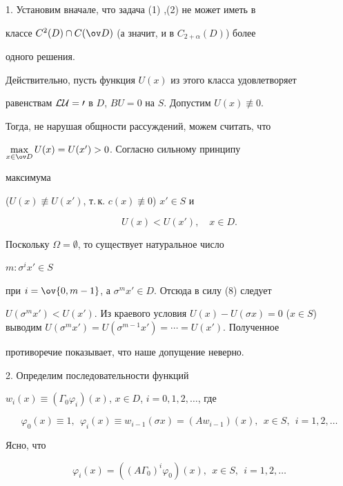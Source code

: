 1. Установим вначале, что задача (1) ,(2) не может иметь в 


классе $C^2(D)\cap C(\ov D)$ (а значит, и в $C_{2+\alpha}(D)$) более 


одного решения. 


Действительно, пусть функция $U(x)$ из этого класса удовлетворяет 


равенствам $\cal L\cal U=0$ в $D$, $B U=0$ на $S$. Допустим $U(x)\not\equiv0$. 


Тогда, не нарушая общности рассуждений, можем считать, что 


$\max\limits_{x\in\ov D}U(x)=U(x')>0$. Согласно сильному принципу 


максимума 


($U(x)\not\equiv U(x')$, т.\,к. $c(x)\not\equiv0$) $x'\in S$ и 


\begin{equation} 


U(x)<U(x'),\quad x\in D. 


\end{equation} 


Поскольку $\Omega=\emptyset$, то существует натуральное число 


$m:\sigma^i x'\in S$ 


при $i=\ov{0,m-1}$, а $\sigma^m x'\in D$. Отсюда в силу (8) следует 


$U(\sigma^m x')<U(x')$. Из краевого условия $U(x)-U(\sigma x)=0$ ($x\in 


S$) выводим $U(\sigma^m x')=U(\sigma^{m-1}x')=\dotsb=U(x')$. Полученное 


противоречие показывает, что наше допущение неверно. 


\medskip 


 


2. Определим последовательности функций 


$w_i(x)\equiv(\Gamma_0\varphi_i)(x)$, $x\in D$, $i=0,1,2,\dotsc$, где 


$$ 


\varphi_0(x)\equiv1,\ \ \varphi_i(x)\equiv w_{i-1}(\sigma x)= 


(A w_{i-1})(x),\ \ x\in S,\ \ i=1,2,\dotsc 


$$ 


Ясно, что 


\begin{equation} 


\varphi_i(x)=((A\Gamma_0)^i\varphi_0)(x), 


\ \ x\in S,\ \ i=1,2,\dotsc 


\end{equation} 


